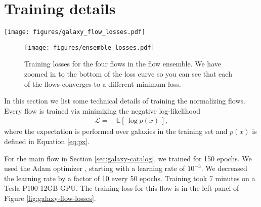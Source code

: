 \documentclass[twocolumn]{aastex631}
\begin{document}
\appendix

\section{Training details}
\label{app:training-details}

\begin{figure*}[t!]
    \begin{centering}
        \texttt{[image: figures/galaxy\_flow\_losses.pdf]}
        \caption{
            Training losses for the galaxy flows.
            Left: losses for the normal flow.
            After epochs 50 and 100, you can see a drop in the loss due to the decrease in the learning rate.
            Right: losses for the conditional flow.
            After epochs 150 and 300, you can see a drop in the loss due to the decrease in the learning rate.
        }
        \label{fig:galaxy-flow-losses}
    \end{centering}
\end{figure*}

\begin{figure}[t!]
    \begin{centering}
        \texttt{[image: figures/ensemble\_losses.pdf]}
        \caption{
            Training losses for the four flows in the flow ensemble.
            We have zoomed in to the bottom of the loss curve so you can see that each of the flows converges to a different minimum loss.
        }
        \label{fig:ensemble-losses}
    \end{centering}
\end{figure}

In this section we list some technical details of training the normalizing flows.
Every flow is trained via minimizing the negative log-likelihood
\begin{align}
    \mathcal{L} = - \, \mathbb{E}[ \, \log p(x) \, ],
\end{align}
where the expectation is performed over galaxies in the training set and $p(x)$ is defined in Equation \ref{eq:px}.

For the main flow in Section \ref{sec:galaxy-catalog}, we trained for 150 epochs.
We used the Adam optimizer \citep{adam}, starting with a learning rate of $10^{-3}$.
We decreased the learning rate by a factor of 10 every 50 epochs.
Training took 7 minutes on a Tesla P100 12GB GPU.
The training loss for this flow is in the left panel of Figure \ref{fig:galaxy-flow-losses}.
\end{document}
